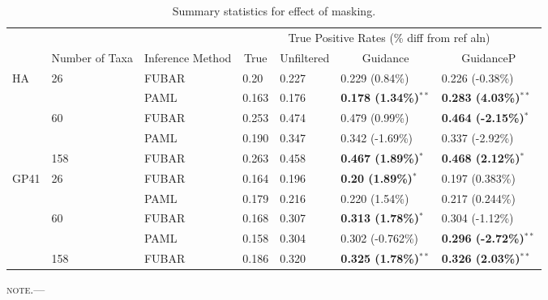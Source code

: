 \documentclass[11pt]{article}
\begin{document}
\begin{table}[hbt]
\caption {\label{tab:summarystats} Summary statistics for effect of masking.}
\begin{tabular}{l l l l l l l}
\hline\noalign{\smallskip}
& & & \multicolumn{4}{c}{True Positive Rates (\% diff from ref aln)} \\
\cline{4-7}\noalign{\smallskip}
\multicolumn{1}{c}{Selective Profile} & \multicolumn{1}{c}{Number of Taxa} & \multicolumn{1}{c}{Inference Method} & \multicolumn{1}{c}{True} & \multicolumn{1}{c}{Unfiltered} & \multicolumn{1}{c}{Guidance} & \multicolumn{1}{c}{GuidanceP} \\
\noalign{\smallskip}\hline\noalign{\smallskip}
HA & 26 & FUBAR & 0.20 & 0.227 & 0.229 (0.84\%) & 0.226 (-0.38\%) \\
 &   & PAML & 0.163 & 0.176 & \textbf{0.178 (1.34\%)}$^{\ast\ast}$ & \textbf{0.283 (4.03\%)}$^{\ast\ast}$ \\
\hline
 & 60 & FUBAR & 0.253 & 0.474 & 0.479 (0.99\%) & \textbf{0.464 (-2.15\%)}$^{\ast}$  \\
 &  & PAML & 0.190 & 0.347 & 0.342 (-1.69\%) & 0.337 (-2.92\%) \\
 \hline
 & 158 & FUBAR & 0.263 & 0.458 & \textbf{0.467 (1.89\%)}$^{\ast}$ & \textbf{0.468 (2.12\%)}$^{\ast}$ \\
\hline
GP41 & 26 & FUBAR & 0.164 & 0.196 & \textbf{0.20 (1.89\%)}$^{\ast}$ & 0.197 (0.383\%) \\
 & & PAML & 0.179 & 0.216 & 0.220 (1.54\%) & 0.217 (0.244\%) \\
 \hline
 & 60 & FUBAR & 0.168 & 0.307 & \textbf{0.313 (1.78\%)}$^{\ast}$ & 0.304 (-1.12\%)\\
 & & PAML & 0.158 & 0.304 & 0.302 (-0.762\%) & \textbf{0.296 (-2.72\%)}$^{\ast\ast}$ \\
 \hline
 & 158 & FUBAR & 0.186 & 0.320 & \textbf{0.325 (1.78\%)}$^{\ast\ast}$ & \textbf{0.326 (2.03\%)}$^{\ast\ast}$ \\
\hline
\end{tabular}
\newline
\textsc{note.}--- %
\end{table}
\end{document}

